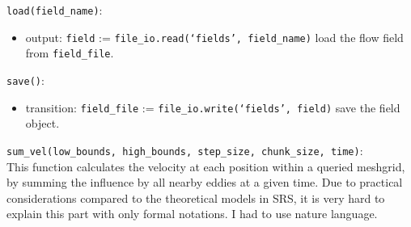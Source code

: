 \documentclass[12pt, titlepage]{article}
\begin{document}
\noindent \texttt{load(field\_name)}:
\begin{itemize}
  \item output: \texttt{field} := \texttt{file\_io.read(`fields', field\_name)} load the flow field from \texttt{field\_file}.
\end{itemize}

\noindent \texttt{save()}:
\begin{itemize}
  \item transition: \texttt{field\_file} := \texttt{file\_io.write(`fields', field)} save the field object.
\end{itemize}

\noindent \texttt{sum\_vel(low\_bounds, high\_bounds, step\_size, chunk\_size, time)}:\\
This function calculates the velocity at each position within a queried meshgrid, by summing the influence by all nearby eddies at a given time. Due to practical considerations compared to the theoretical models in SRS, it is very hard to explain this part with only formal notations. I had to use nature language.
\end{document}

